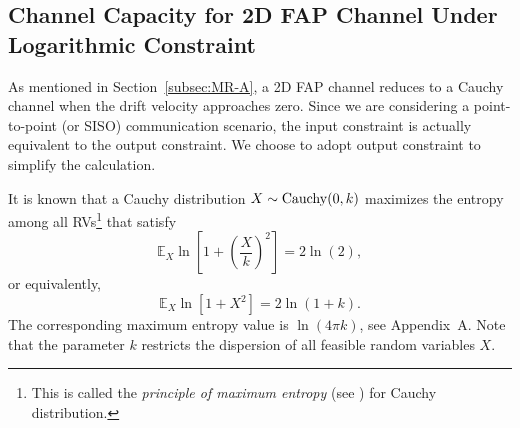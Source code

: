 \documentclass[conference]{IEEEtran}
\newcommand{\E}{\mathbb{E}}
\theoremstyle{definition}
\theoremstyle{plain}
\begin{document}

\subsection{Channel Capacity for 2D FAP Channel Under Logarithmic Constraint}\label{MR-B}
As mentioned in Section~\ref{subsec:MR-A}, a 2D FAP channel reduces to a Cauchy channel when the drift velocity approaches zero. Since we are considering a point-to-point (or SISO) communication scenario, the input constraint is actually equivalent to the output constraint. We choose to adopt output constraint to simplify the calculation.

It is known that a Cauchy distribution $X \sim {\rm Cauchy}(0,k)$ maximizes the entropy among all RVs\footnote{This is called the \textit{principle of maximum entropy} (see \cite{kapur1989maximum}) for Cauchy distribution.} that satisfy 
\begin{equation}
\E_X \ln \left[1+\left(\frac{X}{k}\right)^2\right] = 2\ln(2),
\end{equation}
or equivalently,
\begin{equation}
\E_X \ln \left[1+X^2\right] = 2\ln(1+k).
\end{equation}
The corresponding maximum entropy value is $\ln(4\pi k)$, see Appendix~A. Note that
the parameter $k$ restricts the dispersion of all feasible random variables $X$.

\end{document}
